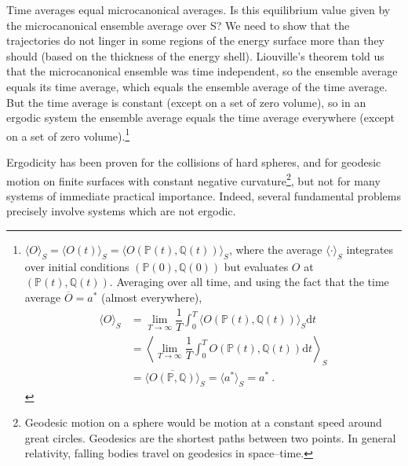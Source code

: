 \documentclass[12pt,a4paper]{article}
\newcommand{\dif}{\mathrm{d}}
\newcounter{theo}[section]\setcounter{theo}{0}
\begin{document}
Time averages equal microcanonical averages. Is this equilibrium value given by the microcanonical ensemble average over S? We need to show that the trajectories do not linger in some regions of the energy surface more than they should (based on the thickness of the energy shell). Liouville's theorem told us that the microcanonical ensemble was time independent, so the
ensemble average equals its time average, which equals the ensemble average of the time average. But the time average is constant (except on a set of zero volume), so in an ergodic system the ensemble average equals the time average everywhere (except on a set of zero volume).\footnote{$\langle O\rangle_S = \langle O(t) \rangle_S = \langle O(\mathbb P(t), \mathbb Q(t))\rangle_S$, where the average $\langle \cdot \rangle_S$ integrates over initial conditions $(\mathbb P(0), \mathbb Q(0))$ but evaluates $O$ at $(\mathbb P(t), \mathbb Q(t))$. Averaging over all time, and using the fact that the time average $\overline{O} = a^\ast$ (almost everywhere), 
\begin{align}
\nonumber \langle O\rangle_S &= \lim\limits_{T\rightarrow \infty} \dfrac{1}{T} \int_0^T \langle O(\mathbb P(t), \mathbb Q(t))\rangle_S \dif t \\
\nonumber &= \left\langle \lim\limits_{T\rightarrow \infty} \dfrac{1}{T} \int_0^T  O(\mathbb P(t), \mathbb Q(t)) \dif t \right\rangle_S \\
\nonumber &= \langle \overline{ O(\mathbb P, \mathbb Q) }\rangle_S = \langle a^\ast \rangle_S = a^\ast ~.
\end{align}
}

















Ergodicity has been proven for the collisions of hard spheres, and for geodesic motion on finite surfaces with constant negative curvature\footnote{Geodesic motion on a sphere would be motion at a constant speed around great circles. Geodesics are the shortest paths between two points. In general relativity, falling bodies travel on geodesics in space–time.}, but not for many systems of immediate practical importance. Indeed, several fundamental problems precisely involve systems which are not ergodic.



















\end{document}
